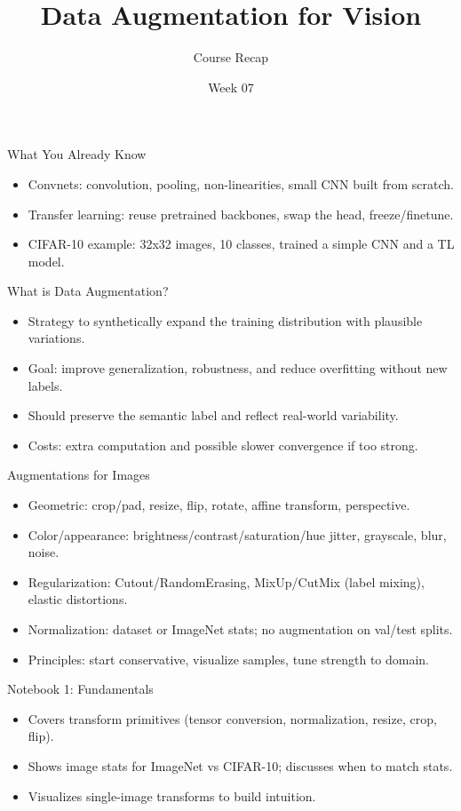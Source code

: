 \documentclass{beamer}
\title{Data Augmentation for Vision}
\author{Course Recap}
\date{Week 07}
\begin{document}
\begin{frame}
  \titlepage
\end{frame}

\begin{frame}{What You Already Know}
  \begin{itemize}
    \item Convnets: convolution, pooling, non-linearities, small CNN built from scratch.
    \item Transfer learning: reuse pretrained backbones, swap the head, freeze/finetune.
    \item CIFAR-10 example: 32x32 images, 10 classes, trained a simple CNN and a TL model.
  \end{itemize}
\end{frame}

\begin{frame}{What is Data Augmentation?}
  \begin{itemize}
    \item Strategy to synthetically expand the training distribution with plausible variations.
    \item Goal: improve generalization, robustness, and reduce overfitting without new labels.
    \item Should preserve the semantic label and reflect real-world variability.
    \item Costs: extra computation and possible slower convergence if too strong.
  \end{itemize}
\end{frame}

\begin{frame}{Augmentations for Images}
  \begin{itemize}
    \item Geometric: crop/pad, resize, flip, rotate, affine transform, perspective.
    \item Color/appearance: brightness/contrast/saturation/hue jitter, grayscale, blur, noise.
    \item Regularization: Cutout/RandomErasing, MixUp/CutMix (label mixing), elastic distortions.
    \item Normalization: dataset or ImageNet stats; no augmentation on val/test splits.
    \item Principles: start conservative, visualize samples, tune strength to domain.
  \end{itemize}
\end{frame}

\begin{frame}{Notebook 1: Fundamentals}
  \begin{itemize}
    \item Covers transform primitives (tensor conversion, normalization, resize, crop, flip).
    \item Shows image stats for ImageNet vs CIFAR-10; discusses when to match stats.
    \item Visualizes single-image transforms to build intuition.
  \end{itemize}
\end{frame}
\end{document}
